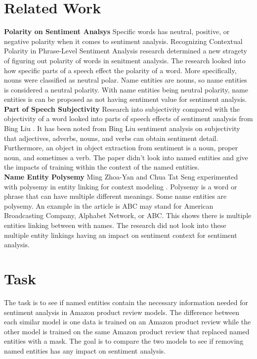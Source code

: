\documentclass[11pt,a4paper]{article}
\begin{document}
\section{Related Work}

\noindent \textbf{Polarity on Sentiment Analsys} Specific words has neutral, positive, or negative polarity when it comes to sentiment analysis. Recognizing Contextual Polarity in Phrase-Level Sentiment Analysis research determined a new stragety of figuring out polarity of words in senitment analysis. The research looked into how specific parts of a speech effect the polarity of a word. More specifically, nouns were classified as neutral polar. Name entities are nouns, so name entities is considered a neutral polarity. With name entities being neutral polarity, name entities is can be proposed as not having sentiment value for sentiment analysis. \\

\noindent \textbf{Part of Speech Subjectivity} Research into subjectivity compared with the objectivity of a word looked into parts of speech effects of sentiment analysis from Bing Liu \cite{subject}. It has been noted from Bing Liu sentiment analysis on subjectivity that adjectives, adverbs, nouns, and verbs can obtain sentiment detail. Furthermore, an object in object extraction from sentiment is a noun, proper noun, and sometimes a verb. The paper didn't look into named entities and give the impacts of training within the context of the named entities. \\

\noindent \textbf{Name Entity Polysemy} Ming Zhoa-Yan and Chua Tat Seng experimented with polysemy in entity linking for context modeling \cite{MING201518}. Polysemy is a word or phrase that can have multiple different meanings. Some name entities are polysemy. An example in the article is ABC may stand for American Broadcasting Company, Alphabet Network, or ABC. This shows there is multiple entities linking between with names. The research did not look into these multiple entity linkings having an impact on sentiment context for sentiment analysis.

\section{Task}

The task is to see if named entities contain the necessary information needed for sentiment analysis in Amazon product review models. The difference between each similar model is one data is trained on an Amazon product review while the other model is trained on the same Amazon product review that replaced named entities with a mask. The goal is to compare the two models to see if removing named entities has any impact on sentiment analysis.
\end{document}
